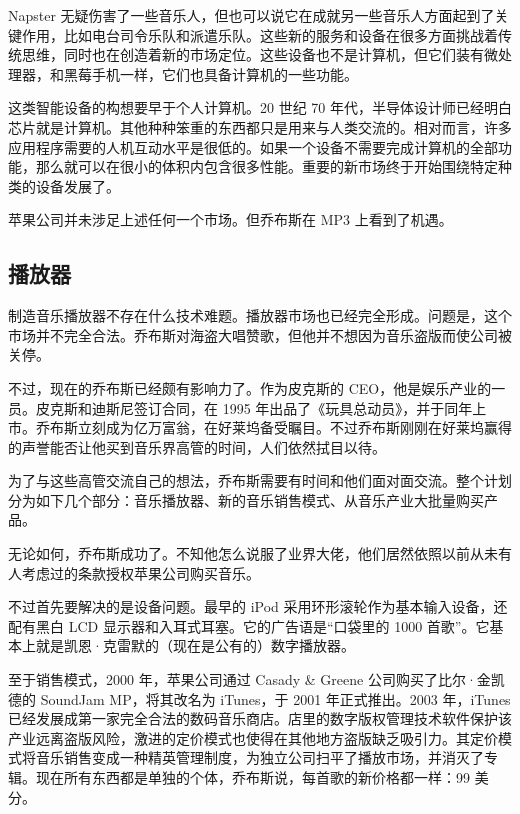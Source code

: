 \documentclass[12pt,UTF8]{ctexbook}
\begin{document}
Napster 无疑伤害了一些音乐人，但也可以说它在成就另一些音乐人方面起到了关键作用，比如电台司令乐队和派遣乐队。这些新的服务和设备在很多方面挑战着传统思维，同时也在创造着新的市场定位。这些设备也不是计算机，但它们装有微处理器，和黑莓手机一样，它们也具备计算机的一些功能。

这类智能设备的构想要早于个人计算机。20 世纪 70 年代，半导体设计师已经明白芯片就是计算机。其他种种笨重的东西都只是用来与人类交流的。相对而言，许多应用程序需要的人机互动水平是很低的。如果一个设备不需要完成计算机的全部功能，那么就可以在很小的体积内包含很多性能。重要的新市场终于开始围绕特定种类的设备发展了。

苹果公司并未涉足上述任何一个市场。但乔布斯在 MP3 上看到了机遇。





\subsection{播放器}


制造音乐播放器不存在什么技术难题。播放器市场也已经完全形成。问题是，这个市场并不完全合法。乔布斯对海盗大唱赞歌，但他并不想因为音乐盗版而使公司被关停。

不过，现在的乔布斯已经颇有影响力了。作为皮克斯的 CEO，他是娱乐产业的一员。皮克斯和迪斯尼签订合同，在 1995 年出品了《玩具总动员》，并于同年上市。乔布斯立刻成为亿万富翁，在好莱坞备受瞩目。不过乔布斯刚刚在好莱坞赢得的声誉能否让他买到音乐界高管的时间，人们依然拭目以待。

为了与这些高管交流自己的想法，乔布斯需要有时间和他们面对面交流。整个计划分为如下几个部分：音乐播放器、新的音乐销售模式、从音乐产业大批量购买产品。

无论如何，乔布斯成功了。不知他怎么说服了业界大佬，他们居然依照以前从未有人考虑过的条款授权苹果公司购买音乐。

不过首先要解决的是设备问题。最早的 iPod 采用环形滚轮作为基本输入设备，还配有黑白 LCD 显示器和入耳式耳塞。它的广告语是“口袋里的 1000 首歌”。它基本上就是凯恩·克雷默的（现在是公有的）数字播放器。

至于销售模式，2000 年，苹果公司通过 Casady \& Greene 公司购买了比尔·金凯德的 SoundJam MP，将其改名为 iTunes，于 2001 年正式推出。2003 年，iTunes 已经发展成第一家完全合法的数码音乐商店。店里的数字版权管理技术软件保护该产业远离盗版风险，激进的定价模式也使得在其他地方盗版缺乏吸引力。其定价模式将音乐销售变成一种精英管理制度，为独立公司扫平了播放市场，并消灭了专辑。现在所有东西都是单独的个体，乔布斯说，每首歌的新价格都一样：99 美分。
\end{document}

